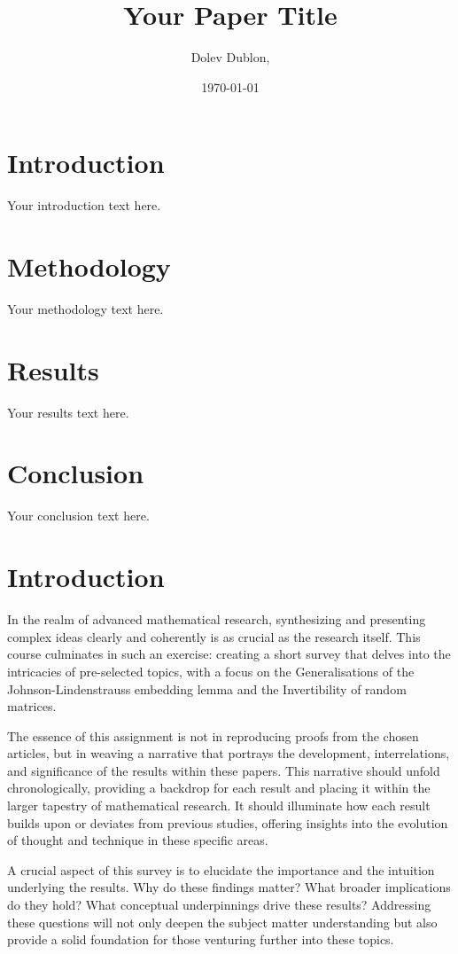 \documentclass{article}
\title{Your Paper Title}
\author{Dolev Dublon,}
\date{\today}
\begin{document}
\maketitle

\section{Introduction}
Your introduction text here.

\section{Methodology}
Your methodology text here.

\section{Results}
Your results text here.

\section{Conclusion}
Your conclusion text here.



\section{Introduction}

In the realm of advanced mathematical research, synthesizing and presenting complex ideas clearly and coherently is as crucial as the research itself. This course culminates in such an exercise: creating a short survey that delves into the intricacies of pre-selected topics, with a focus on the Generalisations of the Johnson-Lindenstrauss embedding lemma and the Invertibility of random matrices.

The essence of this assignment is not in reproducing proofs from the chosen articles, but in weaving a narrative that portrays the development, interrelations, and significance of the results within these papers. This narrative should unfold chronologically, providing a backdrop for each result and placing it within the larger tapestry of mathematical research. It should illuminate how each result builds upon or deviates from previous studies, offering insights into the evolution of thought and technique in these specific areas.

A crucial aspect of this survey is to elucidate the importance and the intuition underlying the results. Why do these findings matter? What broader implications do they hold? What conceptual underpinnings drive these results? Addressing these questions will not only deepen the subject matter understanding but also provide a solid foundation for those venturing further into these topics.
\end{document}
